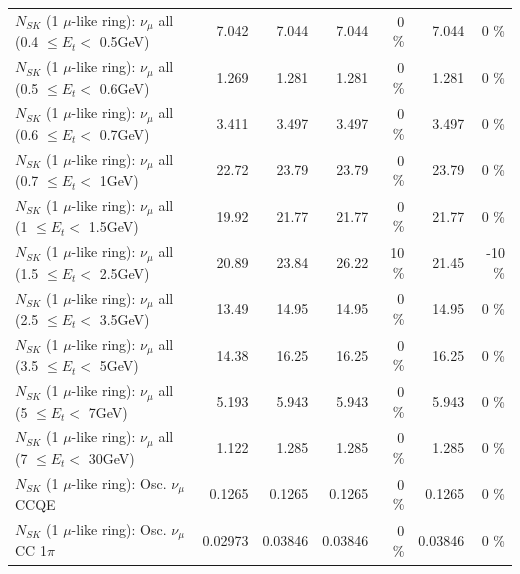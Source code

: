\begin{table}
\begin{tabular}{| l | r | r | r  r | r  r |}
       $N_{SK}$ (1 $\mu$-like ring): $\nu_{\mu}$ all (0.4 $\leq E_{t} <$ 0.5GeV) &           7.042 &           7.044 &           7.044 &        0 \%  &           7.044 &        0 \%  \\ 
       $N_{SK}$ (1 $\mu$-like ring): $\nu_{\mu}$ all (0.5 $\leq E_{t} <$ 0.6GeV) &           1.269 &           1.281 &           1.281 &        0 \%  &           1.281 &        0 \%  \\ 
       $N_{SK}$ (1 $\mu$-like ring): $\nu_{\mu}$ all (0.6 $\leq E_{t} <$ 0.7GeV) &           3.411 &           3.497 &           3.497 &        0 \%  &           3.497 &        0 \%  \\ 
         $N_{SK}$ (1 $\mu$-like ring): $\nu_{\mu}$ all (0.7 $\leq E_{t} <$ 1GeV) &           22.72 &           23.79 &           23.79 &        0 \%  &           23.79 &        0 \%  \\ 
         $N_{SK}$ (1 $\mu$-like ring): $\nu_{\mu}$ all (1 $\leq E_{t} <$ 1.5GeV) &           19.92 &           21.77 &           21.77 &        0 \%  &           21.77 &        0 \%  \\ 
       $N_{SK}$ (1 $\mu$-like ring): $\nu_{\mu}$ all (1.5 $\leq E_{t} <$ 2.5GeV) &           20.89 &           23.84 &           26.22 &       10 \%  &           21.45 &      -10 \%  \\ 
       $N_{SK}$ (1 $\mu$-like ring): $\nu_{\mu}$ all (2.5 $\leq E_{t} <$ 3.5GeV) &           13.49 &           14.95 &           14.95 &        0 \%  &           14.95 &        0 \%  \\ 
         $N_{SK}$ (1 $\mu$-like ring): $\nu_{\mu}$ all (3.5 $\leq E_{t} <$ 5GeV) &           14.38 &           16.25 &           16.25 &        0 \%  &           16.25 &        0 \%  \\ 
           $N_{SK}$ (1 $\mu$-like ring): $\nu_{\mu}$ all (5 $\leq E_{t} <$ 7GeV) &           5.193 &           5.943 &           5.943 &        0 \%  &           5.943 &        0 \%  \\ 
          $N_{SK}$ (1 $\mu$-like ring): $\nu_{\mu}$ all (7 $\leq E_{t} <$ 30GeV) &           1.122 &           1.285 &           1.285 &        0 \%  &           1.285 &        0 \%  \\ 
\hline
\hline
                               $N_{SK}$ (1 $\mu$-like ring): Osc. $\nu_\mu$ CCQE &          0.1265 &          0.1265 &          0.1265 &        0 \%  &          0.1265 &        0 \%  \\ 
                          $N_{SK}$ (1 $\mu$-like ring): Osc. $\nu_\mu$ CC 1$\pi$ &         0.02973 &         0.03846 &         0.03846 &        0 \%  &         0.03846 &        0 \%  \\ 

\end{tabular}
\end{table}

